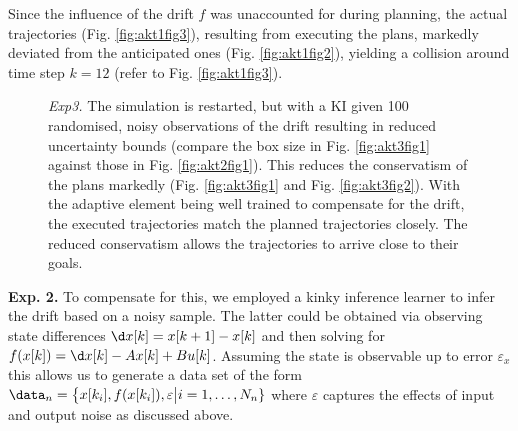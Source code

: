 Since the influence of the drift $f$ was unaccounted for during planning, the actual trajectories (Fig. \ref{fig:akt1fig3}), resulting from executing the plans, markedly deviated from the anticipated ones (Fig. \ref{fig:akt1fig2}), yielding a collision around time step $k = 12$ (refer to Fig. \ref{fig:akt1fig3}).  

 

\begin{figure*}
        \centering
%
   \caption{\textit{Exp3.} The simulation is restarted, but with a KI given 100 randomised, noisy observations of the drift resulting in reduced uncertainty bounds (compare the box size in Fig. \ref{fig:akt3fig1} against those in Fig. \ref{fig:akt2fig1}). This reduces the conservatism of the plans markedly (Fig. \ref{fig:akt3fig1} and Fig. \ref{fig:akt3fig2}). With the adaptive element being well trained to compensate for the drift, the executed trajectories match the planned trajectories closely. The reduced conservatism allows the trajectories to arrive close to their goals. }
		\label{fig:KIcollavoidopenloopakt3}
\end{figure*}	 
%
\textbf{Exp. 2.} 
To compensate for this, we employed a kinky inference learner to infer the drift based on a noisy sample. The latter could be obtained via observing state differences $\d x[k] = x[k+1] - x[k]$ and then solving for $f(x[k]) = \d x[k
] - A x[k] + B u[k]$. Assuming the state is observable up to error $\varepsilon_x$ this allows us to generate a data set of the form $\data_n = \bigl\{ x[k_i], f(x[k_i]), \varepsilon\bigr \vert i=1, \ldots, N_n\}$ where $\varepsilon$ captures the effects of input and output noise as discussed above.


